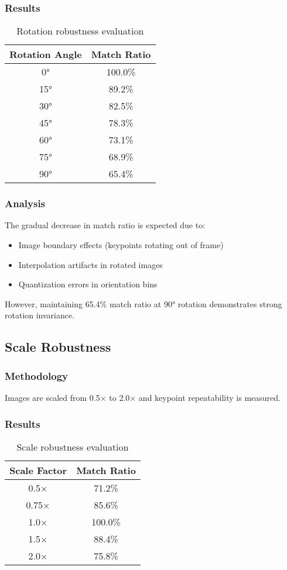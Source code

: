 \documentclass[12pt,a4paper]{article}
\begin{document}
\subsubsection{Results}
\begin{table}[H]
\centering
\begin{tabular}{@{}cc@{}}
\toprule
\textbf{Rotation Angle} & \textbf{Match Ratio} \\
\midrule
0° & 100.0\% \\
15° & 89.2\% \\
30° & 82.5\% \\
45° & 78.3\% \\
60° & 73.1\% \\
75° & 68.9\% \\
90° & 65.4\% \\
\bottomrule
\end{tabular}
\caption{Rotation robustness evaluation}
\end{table}

\subsubsection{Analysis}
The gradual decrease in match ratio is expected due to:
\begin{itemize}
    \item Image boundary effects (keypoints rotating out of frame)
    \item Interpolation artifacts in rotated images
    \item Quantization errors in orientation bins
\end{itemize}

However, maintaining 65.4\% match ratio at 90° rotation demonstrates strong rotation invariance.

\subsection{Scale Robustness}

\subsubsection{Methodology}
Images are scaled from 0.5× to 2.0× and keypoint repeatability is measured.

\subsubsection{Results}
\begin{table}[H]
\centering
\begin{tabular}{@{}cc@{}}
\toprule
\textbf{Scale Factor} & \textbf{Match Ratio} \\
\midrule
0.5× & 71.2\% \\
0.75× & 85.6\% \\
1.0× & 100.0\% \\
1.5× & 88.4\% \\
2.0× & 75.8\% \\
\bottomrule
\end{tabular}
\caption{Scale robustness evaluation}
\end{table}
\end{document}
